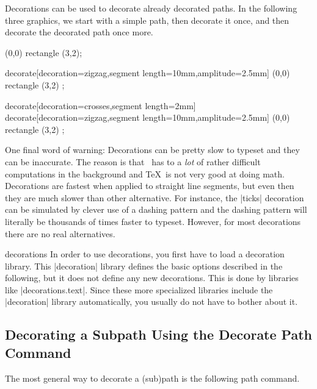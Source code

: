 Decorations can be used to decorate already decorated paths. In the
following three graphics, we start with a simple path, then decorate
it once, and then decorate the decorated path once more.

\begin{codeexample}[]
\tikz \fill [fill=blue!20,draw=blue,thick]
  (0,0) rectangle (3,2);
\end{codeexample}
\begin{codeexample}[]
\tikz \fill [fill=blue!20,draw=blue,thick]
  decorate[decoration={zigzag,segment length=10mm,amplitude=2.5mm}]
    { (0,0) rectangle (3,2) };
\end{codeexample}
\begin{codeexample}[]
\tikz \fill [fill=blue!20,draw=blue,thick]
  decorate[decoration={crosses,segment length=2mm}] {
    decorate[decoration={zigzag,segment length=10mm,amplitude=2.5mm}] {
      (0,0) rectangle (3,2) 
    }
  };
\end{codeexample}

One final word of warning: Decorations can be pretty slow to
typeset and they can be inaccurate. The reason is that \pgfname\ has
to a \emph{lot} of rather difficult computations in the background and
\TeX\ is not very good at doing math. Decorations are fastest when
applied to straight line segments, but even then they are much slower
than other alternative. For instance, the |ticks| decoration can be
simulated by clever use of a dashing pattern and the dashing pattern
will literally be thousands of times faster to typeset. However, for
most decorations there are no real alternatives.

\begin{tikzlibrary}{decorations}
  In order to use decorations, you first have to load a decoration
  library. This |decoration| library defines the basic options
  described in the following, but it does not define any new
  decorations. This is done by libraries like
  |decorations.text|. Since these more specialized libraries include
  the |decoration| library automatically, you usually do not have to
  bother about it.
\end{tikzlibrary}



\subsection{Decorating a Subpath Using the Decorate Path Command}

The most general way to decorate a (sub)path is the following path
command.

